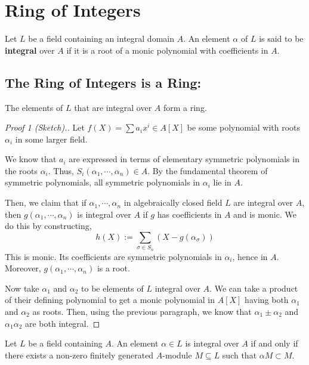 \documentclass[12pt]{amsart}
\begin{document}



\section{Ring of Integers}

\begin{definition}
    Let $L$ be a field containing an integral domain $A$. An element $\alpha$ of $L$ is said to be \textbf{integral} over $A$ if it is a root of a monic polynomial with coefficients in $A$.
\end{definition}
\bbni

\subsection{The Ring of Integers is a Ring:}

\begin{theorem}
    The elements of $L$ that are integral over $A$ form a ring.
\end{theorem}
\begin{proof}[Proof 1 (Sketch).]
    Let $f(X) = \sum a_ix^i \in A[X]$ be some polynomial with roots $\alpha_i$ in some larger field. 

    We know that $a_i$ are expressed in terms of elementary symmetric polynomials in the roots $\alpha_i$. Thus, $S_i(\alpha_1, \cdots, \alpha_n) \in A$. By the fundamental theorem of symmetric polynomials, all symmetric polynomials in $\alpha_i$ lie in $A$. 

    Then, we claim that if $\alpha_1, \cdots, \alpha_n$ in algebraically closed field $L$ are integral over $A$, then $g(\alpha_1, \cdots, \alpha_n)$ is integral over $A$ if $g$ has coefficients in $A$ and is monic. We do this by constructing, 
    \[ h(X) := \sum_{\sigma \in S_n} (X-g(\alpha_\sigma))\]
    This is monic. Its coefficients are symmetric polynomials in $\alpha_i$, hence in $A$. Moreover, $g(\alpha_1, \cdots, \alpha_n)$ is a root. 

    Now take $\alpha_1$ and $\alpha_2$ to be elements of $L$ integral over $A$. We can take a product of their defining polynomial to get a monic polynomial in $A[X]$ having both $\alpha_1$ and $\alpha_2$ as roots. Then, using the previous paragraph, we know that $\alpha_1 \pm \alpha_2$ and $\alpha_1\alpha_2$ are both integral. 
\end{proof}

\begin{theorem}
    Let $L$ be a field containing $A$. An element $\alpha \in L$ is integral over $A$ if and only if there exists a non-zero finitely generated $A$-module $M \subseteq L$ such that $\alpha M \subset M$. 
\end{theorem}
\end{document}
